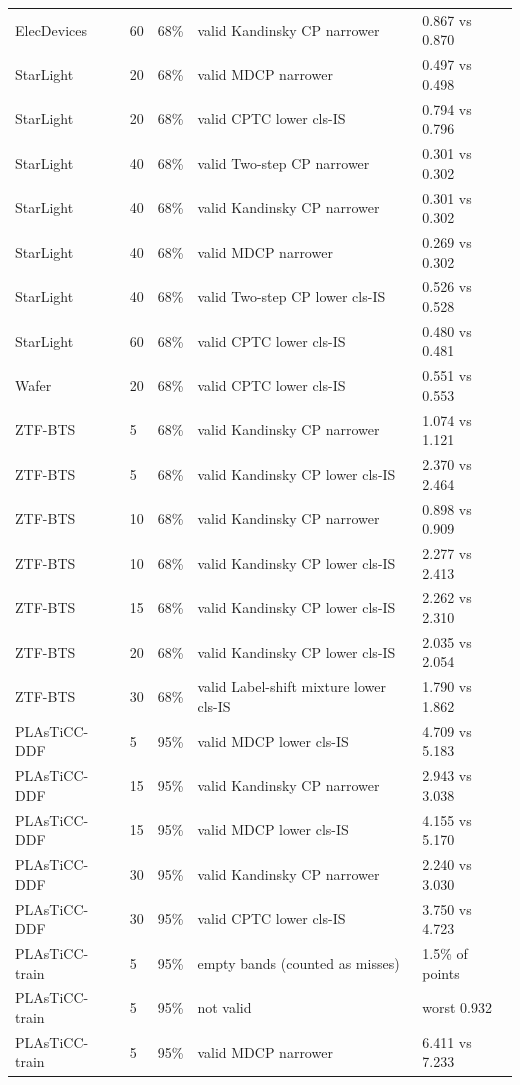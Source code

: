 \begin{longtable}{lllll}
ElecDevices & 60 & 68\% & valid Kandinsky CP narrower & 0.867 vs 0.870 \\
StarLight & 20 & 68\% & valid MDCP narrower & 0.497 vs 0.498 \\
StarLight & 20 & 68\% & valid CPTC lower cls-IS & 0.794 vs 0.796 \\
StarLight & 40 & 68\% & valid Two-step CP narrower & 0.301 vs 0.302 \\
StarLight & 40 & 68\% & valid Kandinsky CP narrower & 0.301 vs 0.302 \\
StarLight & 40 & 68\% & valid MDCP narrower & 0.269 vs 0.302 \\
StarLight & 40 & 68\% & valid Two-step CP lower cls-IS & 0.526 vs 0.528 \\
StarLight & 60 & 68\% & valid CPTC lower cls-IS & 0.480 vs 0.481 \\
Wafer & 20 & 68\% & valid CPTC lower cls-IS & 0.551 vs 0.553 \\
ZTF-BTS & 5 & 68\% & valid Kandinsky CP narrower & 1.074 vs 1.121 \\
ZTF-BTS & 5 & 68\% & valid Kandinsky CP lower cls-IS & 2.370 vs 2.464 \\
ZTF-BTS & 10 & 68\% & valid Kandinsky CP narrower & 0.898 vs 0.909 \\
ZTF-BTS & 10 & 68\% & valid Kandinsky CP lower cls-IS & 2.277 vs 2.413 \\
ZTF-BTS & 15 & 68\% & valid Kandinsky CP lower cls-IS & 2.262 vs 2.310 \\
ZTF-BTS & 20 & 68\% & valid Kandinsky CP lower cls-IS & 2.035 vs 2.054 \\
ZTF-BTS & 30 & 68\% & valid Label-shift mixture lower cls-IS & 1.790 vs 1.862 \\
PLAsTiCC-DDF & 5 & 95\% & valid MDCP lower cls-IS & 4.709 vs 5.183 \\
PLAsTiCC-DDF & 15 & 95\% & valid Kandinsky CP narrower & 2.943 vs 3.038 \\
PLAsTiCC-DDF & 15 & 95\% & valid MDCP lower cls-IS & 4.155 vs 5.170 \\
PLAsTiCC-DDF & 30 & 95\% & valid Kandinsky CP narrower & 2.240 vs 3.030 \\
PLAsTiCC-DDF & 30 & 95\% & valid CPTC lower cls-IS & 3.750 vs 4.723 \\
PLAsTiCC-train & 5 & 95\% & \gamut{} empty bands (counted as misses) & 1.5\% of points \\
PLAsTiCC-train & 5 & 95\% & \gamut{} not valid & worst 0.932 \\
PLAsTiCC-train & 5 & 95\% & valid MDCP narrower & 6.411 vs 7.233 \\

\end{longtable}
